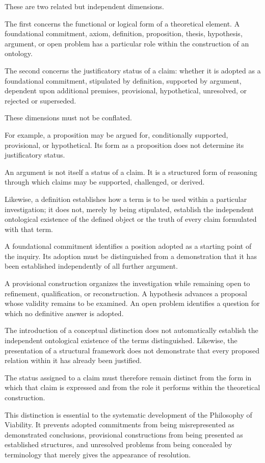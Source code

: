 These are two related but independent dimensions.

The first concerns the functional or logical form
of a theoretical element. A foundational commitment,
axiom, definition, proposition, thesis, hypothesis,
argument, or open problem has a particular role
within the construction of an ontology.

The second concerns the justificatory status of
a claim: whether it is adopted as a foundational
commitment, stipulated by definition, supported
by argument, dependent upon additional premises,
provisional, hypothetical, unresolved, or rejected
or superseded.

These dimensions must not be conflated.

For example, a proposition may be argued for,
conditionally supported, provisional, or
hypothetical. Its form as a proposition does
not determine its justificatory status.

An argument is not itself a status of a claim.
It is a structured form of reasoning through
which claims may be supported, challenged,
or derived.

Likewise, a definition establishes how a term
is to be used within a particular investigation;
it does not, merely by being stipulated, establish
the independent ontological existence of the
defined object or the truth of every claim
formulated with that term.

A foundational commitment identifies a position
adopted as a starting point of the inquiry.
Its adoption must be distinguished from a
demonstration that it has been established
independently of all further argument.

A provisional construction organizes the
investigation while remaining open to refinement,
qualification, or reconstruction. A hypothesis
advances a proposal whose validity remains
to be examined. An open problem identifies
a question for which no definitive answer is
adopted.

The introduction of a conceptual distinction
does not automatically establish the independent
ontological existence of the terms distinguished.
Likewise, the presentation of a structural
framework does not demonstrate that every
proposed relation within it has already been
justified.

The status assigned to a claim must therefore
remain distinct from the form in which that
claim is expressed and from the role it performs
within the theoretical construction.

This distinction is essential to the systematic
development of the Philosophy of Viability.
It prevents adopted commitments from being
misrepresented as demonstrated conclusions,
provisional constructions from being presented
as established structures, and unresolved
problems from being concealed by terminology
that merely gives the appearance of resolution.

